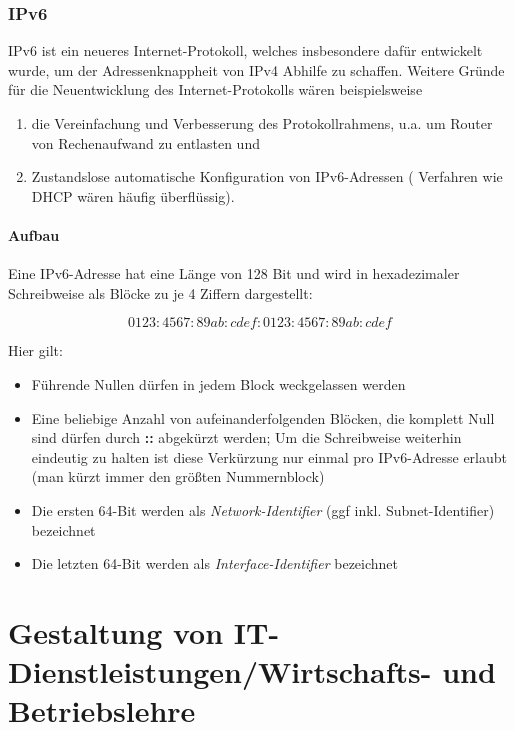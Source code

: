 \documentclass[a4paper, 12pt]{report}
\begin{document}
\subsection{IPv6}

IPv6 ist ein neueres Internet-Protokoll, welches insbesondere dafür entwickelt 
wurde, um der Adressenknappheit von IPv4 Abhilfe zu schaffen. Weitere Gründe 
für die Neuentwicklung des Internet-Protokolls wären beispielsweise 

\begin{enumerate}
	\item die Vereinfachung und Verbesserung des Protokollrahmens, u.a. um
		Router von Rechenaufwand zu entlasten und 
	\item Zustandslose automatische Konfiguration von IPv6-Adressen (
		Verfahren wie DHCP wären häufig überflüssig). 
\end{enumerate}

\subsubsection{Aufbau}

Eine IPv6-Adresse hat eine Länge von 128 Bit und wird in hexadezimaler 
Schreibweise als Blöcke zu je 4 Ziffern dargestellt:

\begin{equation}
	0123:4567:89ab:cdef:0123:4567:89ab:cdef
\end{equation}

Hier gilt: 
\begin{itemize}
	\item Führende Nullen dürfen in jedem Block weckgelassen werden
	\item Eine beliebige Anzahl von aufeinanderfolgenden Blöcken, die 
		komplett Null sind dürfen durch \textbf{::} abgekürzt werden; 
		Um die Schreibweise weiterhin eindeutig zu halten ist diese 
		Verkürzung nur einmal pro IPv6-Adresse erlaubt (man kürzt immer 
		den größten Nummernblock)
	\item Die ersten 64-Bit werden als \emph{Network-Identifier} (ggf inkl. 
		Subnet-Identifier) bezeichnet
	\item Die letzten 64-Bit werden als \emph{Interface-Identifier} 
		bezeichnet
\end{itemize}



\chapter{Gestaltung von IT-Dienstleistungen/Wirtschafts- und Betriebslehre}
\end{document}
